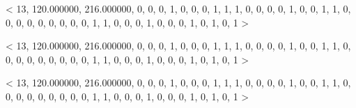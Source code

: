 < 13, 120.000000, 216.000000, 0, 0, 0, 1, 0, 0, 0, 1, 1, 1, 0, 0, 0, 0, 1, 0, 0, 1, 1, 0, 0, 0, 0, 0, 0, 0, 0, 0, 1, 1, 0, 0, 0, 1, 0, 0, 0, 1, 0, 1, 0, 1 > 

< 13, 120.000000, 216.000000, 0, 0, 0, 1, 0, 0, 0, 1, 1, 1, 0, 0, 0, 0, 1, 0, 0, 1, 1, 0, 0, 0, 0, 0, 0, 0, 0, 0, 1, 1, 0, 0, 0, 1, 0, 0, 0, 1, 0, 1, 0, 1 > 

< 13, 120.000000, 216.000000, 0, 0, 0, 1, 0, 0, 0, 1, 1, 1, 0, 0, 0, 0, 1, 0, 0, 1, 1, 0, 0, 0, 0, 0, 0, 0, 0, 0, 1, 1, 0, 0, 0, 1, 0, 0, 0, 1, 0, 1, 0, 1 > 